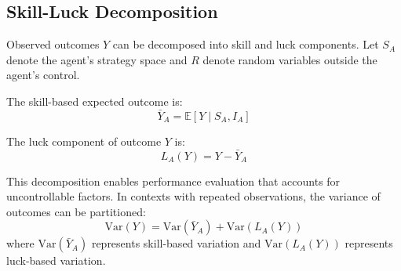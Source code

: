   \subsection{Skill-Luck Decomposition}

  Observed outcomes $Y$ can be decomposed into skill and luck components.
  Let $S_{A}$ denote the agent's strategy space and $R$ denote random
  variables outside the agent's control.

  \begin{definition}
    The skill-based expected outcome is:
    \begin{equation}
      \bar{Y}_{A} = \mathbb{E}[Y \mid S_{A}, I_{A}]
    \end{equation}
  \end{definition}

  \begin{definition}
    The luck component of outcome $Y$ is:
    \begin{equation}
      L_{A}(Y) = Y - \bar{Y}_{A}
    \end{equation}
  \end{definition}

  This decomposition enables performance evaluation that accounts for
  uncontrollable factors. In contexts with repeated observations, the
  variance of outcomes can be partitioned:
  \begin{equation}
    \text{Var}(Y) = \text{Var}(\bar{Y}_{A}) + \text{Var}(L_{A}(Y))
  \end{equation}
  where $\text{Var}(\bar{Y}_{A})$ represents skill-based variation and $\text{Var}
  (L_{A}(Y))$ represents luck-based variation.

